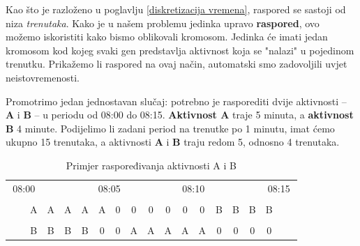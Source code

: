 \documentclass[times, utf8, zavrsni]{fer}
\begin{document}
Kao što je razloženo u poglavlju \ref{diskretizacija vremena}, raspored se sastoji od niza \textit{trenutaka}. Kako je u našem problemu jedinka upravo \textbf{raspored}, ovo možemo iskoristiti kako bismo oblikovali kromosom. Jedinka će imati jedan kromosom kod kojeg svaki gen predstavlja aktivnost koja se "nalazi" u pojedinom trenutku. Prikažemo li raspored na ovaj način, automatski smo zadovoljili uvjet neistovremenosti.

Promotrimo jedan jednostavan slučaj: potrebno je rasporediti dvije aktivnosti -- \textbf{A} i \textbf{B} -- u periodu od 08:00 do 08:15. \textbf{Aktivnost A} traje 5 minuta, a \textbf{aktivnost B} 4 minute. Podijelimo li zadani period na trenutke po 1 minutu, imat ćemo ukupno 15 trenutaka, a aktivnosti \textbf{A} i \textbf{B} traju redom 5, odnosno 4 trenutaka.

\begin{table}[!htbp]
\centering
\caption{Primjer raspoređivanja aktivnosti A i B}
\label{chromosomes-1}
\begin{tabular}{lllllcllllclllllcll}
\multicolumn{3}{c}{08:00} &  &  & \multicolumn{4}{c}{08:05} &  & \multicolumn{4}{c}{08:10} &  &  & \multicolumn{3}{c}{08:15} \\
 & \multicolumn{1}{l|}{} &  &  &  & \multicolumn{1}{l}{} & \multicolumn{1}{l|}{} &  &  &  & \multicolumn{1}{l}{} & \multicolumn{1}{l|}{} &  &  &  &  & \multicolumn{1}{l|}{} &  &  \\ \cline{3-17}
 & \multicolumn{1}{l|}{} & \multicolumn{1}{c|}{A} & \multicolumn{1}{c|}{A} & \multicolumn{1}{c|}{A} & \multicolumn{1}{c|}{A} & \multicolumn{1}{c|}{A} & \multicolumn{1}{c|}{0} & \multicolumn{1}{c|}{0} & \multicolumn{1}{c|}{0} & \multicolumn{1}{c|}{0} & \multicolumn{1}{c|}{0} & \multicolumn{1}{c|}{0} & \multicolumn{1}{c|}{B} & \multicolumn{1}{c|}{B} & \multicolumn{1}{c|}{B} & \multicolumn{1}{c|}{B} &  &  \\ \cline{3-17}
 &  &  &  &  & \multicolumn{1}{l}{} &  &  &  &  & \multicolumn{1}{l}{} &  &  &  &  &  & \multicolumn{1}{l}{} &  &  \\ \cline{3-17}
 & \multicolumn{1}{l|}{} & \multicolumn{1}{c|}{B} & \multicolumn{1}{c|}{B} & \multicolumn{1}{c|}{B} & \multicolumn{1}{c|}{B} & \multicolumn{1}{c|}{0} & \multicolumn{1}{c|}{0} & \multicolumn{1}{c|}{A} & \multicolumn{1}{c|}{A} & \multicolumn{1}{c|}{A} & \multicolumn{1}{c|}{A} & \multicolumn{1}{c|}{A} & \multicolumn{1}{c|}{0} & \multicolumn{1}{c|}{0} & \multicolumn{1}{c|}{0} & \multicolumn{1}{c|}{0} &  &  \\ \cline{3-17}
\end{tabular}
\end{table}
\end{document}
